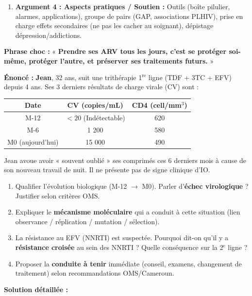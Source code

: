 \documentclass[11pt]{article}
\begin{document}
\begin{methode}
\begin{enumerate}
\begin{itemize}
    \end{itemize}
    \item \textbf{Argument 4 : Aspects pratiques / Soutien :} Outils (boîte pilulier, alarmes, applications), groupe de pairs (GAP, associations PLHIV), prise en charge effets secondaires (ne pas les cacher au soignant), dépistage dépression/addictions.
\end{enumerate}
\textbf{Phrase choc :} « \textbf{Prendre ses ARV tous les jours, c'est se protéger soi-même, protéger l'autre, et préserver ses traitements futurs.} »
\end{methode}

\begin{exoresolu}
\textbf{Énoncé :} \textbf{Jean}, 32 ans, suit une trithérapie 1$^{\text{re}}$ ligne (TDF + 3TC + EFV) depuis 4 ans. Ses 3 derniers résultats de charge virale (CV) sont :
\begin{center}
\begin{tabular}{|c|c|c|}\hline
Date & CV (copies/mL) & CD4 (cell/mm$^3$) \\ \hline
M-12 & $< 20$ (Indétectable) & 620 \\ \hline
M-6 & 1 200 & 580 \\ \hline
M0 (aujourd'hui) & 15 000 & 490 \\ \hline
\end{tabular}
\end{center}
Jean avoue avoir « souvent oublié » ses comprimés ces 6 derniers mois à cause de son nouveau travail de nuit. Il ne présente pas de signe clinique d'IO.
\begin{enumerate}
    \item Qualifier l'évolution biologique (M-12 $\rightarrow$ M0). Parler d'\textbf{échec virologique} ? Justifier selon critères OMS.
    \item Expliquer le \textbf{mécanisme moléculaire} qui a conduit à cette situation (lien observance / réplication / mutation / sélection).
    \item La résistance au EFV (NNRTI) est suspectée. Pourquoi dit-on qu'il y a \textbf{résistance croisée} au sein des NNRTI ? Quelle conséquence sur la 2$^{\text{e}}$ ligne ?
    \item Proposer la \textbf{conduite à tenir} immédiate (conseil, examens, changement de traitement) selon recommandations OMS/Cameroun.
\end{enumerate}
\tcblower
\textbf{Solution détaillée :}
\begin{enumerate}

\end{enumerate}
\end{exoresolu}
\end{document}
